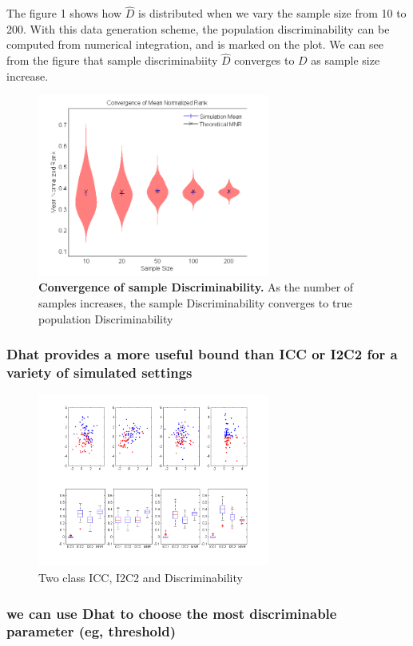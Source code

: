 \documentclass{article}
\begin{document}
The figure 1 shows how $\hat{D}$ is distributed when we vary the sample size from 10 to 200. With this data generation scheme, the population discriminability can be computed from numerical integration, and is marked on the plot. We can see from the figure that sample discriminabiity $\hat{D}$ converges to $D$ as sample size increase.

\begin{figure}[t!]
\includegraphics[width=3.0in]{../Figs/simumnr_violin.png}
\caption{{\bf Convergence of sample Discriminability.} As the number of samples increases, the sample Discriminability  converges to true population Discriminability }
\label{fig:1}
\end{figure}




\subsubsection{Dhat provides a more useful bound than ICC or I2C2 for a variety of simulated settings}

\begin{figure}[t!]
\includegraphics[width=3.0in]{../Figs/Figure1_draft.png}
\caption{Two class ICC, I2C2 and Discriminability}
\label{fig:2}
\end{figure}



\subsubsection{we can use Dhat to choose the most discriminable parameter (eg, threshold)}
\end{document}
